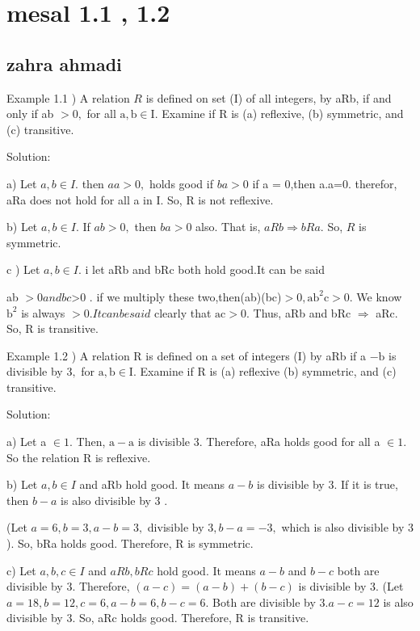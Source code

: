 \documentclass [12pt]{beamer}
\begin{document}
\section*{mesal 1.1 , 1.2 }
\subsection*{zahra ahmadi  }	
\begin{frame}
\justifying
Example 1.1 ) A relation $R$ is defined on set (I) of all integers, by aRb, if and only if ab $>0,$ for all $\mathrm{a}, \mathrm{b} \in \mathrm{I} .$ Examine if $\mathrm{R}$ is (a) reflexive, (b) symmetric, and (c) transitive.
\begin{flushleft}
Solution:
\end{flushleft}
a)  Let $a, b \in I$. then  $aa>0,$ holds good  if $b a>0$ if a = 0,then a.a=0.
therefor, aRa does not hold for all a in I. So, R is not reflexive.
\begin{flushleft}
b) Let $a, b \in I$. If $a b>0,$ then $b a>0$ also. That is, $a R b \Rightarrow b R a .$ So, $R$ is symmetric.
\end{flushleft}
c ) Let $a, b \in I$. i let aRb and bRc both hold good.It can be said 
\begin{flushleft}
ab $>0 and  bc $>0  . if we  multiply these two,then(ab)(bc)$>0,\mathrm{ab}^{2} \mathrm{c}>0 .$ We know $\mathrm{b}^{2}$ is always $>0 .
It can be said $ clearly that $\mathrm{ac}>0$.
Thus, aRb and bRc $\Rightarrow$ aRc. So, R is transitive.
\end{flushleft}
\end{frame}
\begin{frame}	
\justifying
Example 1.2 ) A relation $\mathrm{R}$ is defined on a set of integers (I) by aRb if a $-\mathrm{b}$ is divisible by $3,$ for  $\mathrm{a}, \mathrm{b} \in \mathrm{I} .$ Examine if $\mathrm{R}$ is (a) reflexive (b) symmetric, and (c) transitive.
\begin{flushleft}
Solution:
\end{flushleft}

a) Let a $\in 1 .$ Then, $\mathrm{a}-\mathrm{a}$ is divisible $3 .$ Therefore, aRa holds good for all a $\in 1 .$ So the relation $\mathrm{R}$ is reflexive.
\begin{flushleft}
b) Let $a, b \in I$ and aRb hold good. It means $a-b$ is divisible by $3 .$ If it is true, then $b-a$ is also divisible by 3 .
\end{flushleft} 
\begin{flushleft}
(Let $a=6, b=3, a-b=3,$ divisible by $3, b-a=-3,$ which is also divisible by 3 ). So, bRa holds good. Therefore, $\mathrm{R}$ is symmetric.
\end{flushleft}
\begin{flushleft}
c) Let $a, b, c \in I$ and $a R b, b R c$ hold good. It means $a-b$ and $b-c$ both are divisible by $3 .$ Therefore, $(a-c)=(a-b)+(b-c)$ is divisible by 3.
(Let $a=18, b=12, c=6, a-b=6, b-c=6 .$ Both are divisible by $3 . a-c=12$ is also divisible by $3 .$ So, aRc holds good. Therefore, $\mathrm{R}$ is transitive.
\end{flushleft}
\end{frame}
\end{document}
